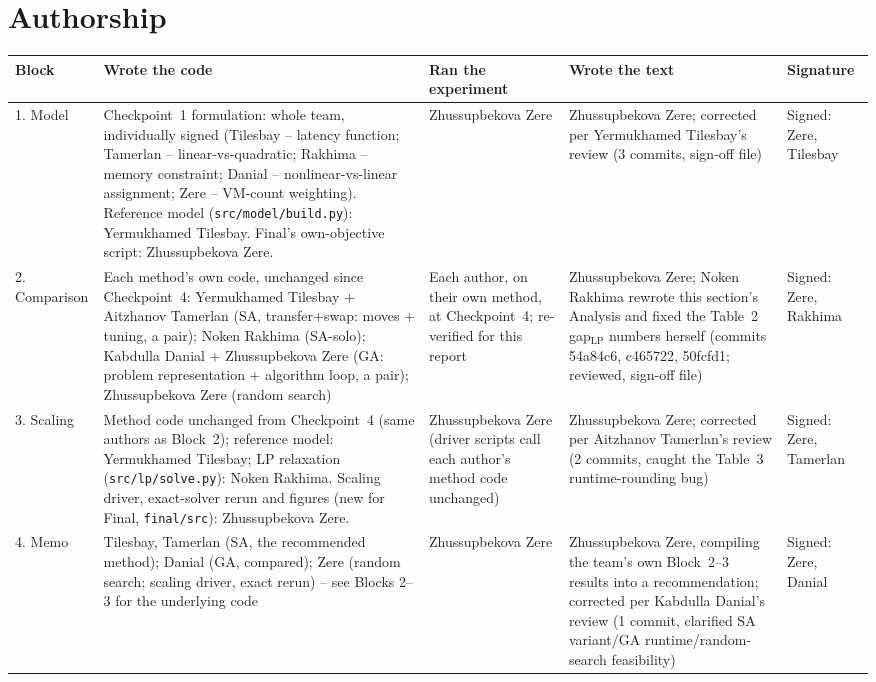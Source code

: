 \documentclass[11pt,a4paper]{article}
\begin{document}
\section{Authorship}
{\small
\begin{longtable}{@{}p{1.6cm}p{4.2cm}p{2.6cm}p{4.2cm}p{2.3cm}@{}}
\toprule
Block & Wrote the code & Ran the experiment & Wrote the text & Signature\\
\midrule
\endhead
1. Model & Checkpoint~1 formulation: whole team, individually signed (Tilesbay -- latency function; Tamerlan -- linear-vs-quadratic; Rakhima -- memory constraint; Danial -- nonlinear-vs-linear assignment; Zere -- VM-count weighting). Reference model (\texttt{src/model/build.py}): Yermukhamed Tilesbay. Final's own-objective script: Zhussupbekova Zere. & Zhussupbekova Zere & Zhussupbekova Zere; corrected per Yermukhamed Tilesbay's review (3 commits, sign-off file) & Signed: Zere, Tilesbay\\[4pt]
2. Comparison & Each method's own code, unchanged since Checkpoint~4: Yermukhamed Tilesbay + Aitzhanov Tamerlan (SA, transfer+swap: moves + tuning, a pair); Noken Rakhima (SA-solo); Kabdulla Danial + Zhussupbekova Zere (GA: problem representation + algorithm loop, a pair); Zhussupbekova Zere (random search) & Each author, on their own method, at Checkpoint~4; re-verified for this report & Zhussupbekova Zere; Noken Rakhima rewrote this section's Analysis and fixed the Table~2 gap$_{\mathrm{LP}}$ numbers herself (commits 54a84c6, c465722, 50fcfd1; reviewed, sign-off file) & Signed: Zere, Rakhima\\[4pt]
3. Scaling & Method code unchanged from Checkpoint~4 (same authors as Block~2); reference model: Yermukhamed Tilesbay; LP relaxation (\texttt{src/lp/solve.py}): Noken Rakhima. Scaling driver, exact-solver rerun and figures (new for Final, \texttt{final/src}): Zhussupbekova Zere. & Zhussupbekova Zere (driver scripts call each author's method code unchanged) & Zhussupbekova Zere; corrected per Aitzhanov Tamerlan's review (2 commits, caught the Table~3 runtime-rounding bug) & Signed: Zere, Tamerlan\\[4pt]
4. Memo & Tilesbay, Tamerlan (SA, the recommended method); Danial (GA, compared); Zere (random search; scaling driver, exact rerun) -- see Blocks 2--3 for the underlying code & Zhussupbekova Zere & Zhussupbekova Zere, compiling the team's own Block~2--3 results into a recommendation; corrected per Kabdulla Danial's review (1 commit, clarified SA variant/GA runtime/random-search feasibility) & Signed: Zere, Danial\\
\bottomrule
\end{longtable}}
\end{document}
